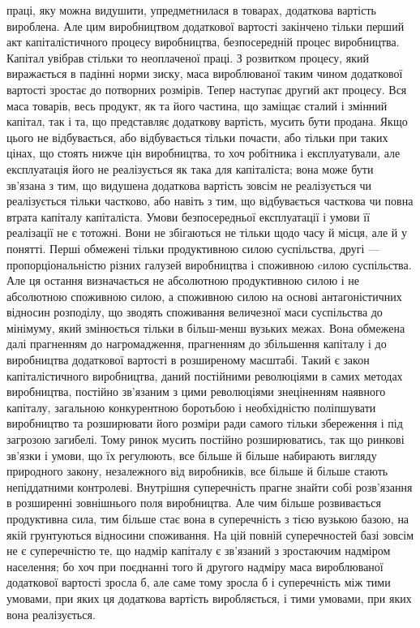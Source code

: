 \parcont{}  %
праці, яку можна видушити, упредметнилася в товарах, додаткова
вартість вироблена. Але цим виробництвом додаткової
вартості закінчено тільки перший акт капіталістичного процесу
виробництва, безпосередній процес виробництва. Капітал увібрав
стільки то неоплаченої праці. З розвитком процесу, який виражається
в падінні норми зиску, маса вироблюваної таким чином
додаткової вартості зростає до потворних розмірів. Тепер
наступає другий акт процесу. Вся маса товарів, весь продукт,
як та його частина, що заміщає сталий і змінний капітал, так
і та, що представляє додаткову вартість, мусить бути продана.
Якщо цього не відбувається, або відбувається тільки почасти,
або тільки при таких цінах, що стоять нижче цін виробництва,
то хоч робітника і експлуатували, але експлуатація його не
реалізується як така для капіталіста; вона може бути зв’язана
з тим, що видушена додаткова вартість зовсім не реалізується чи
реалізується тільки частково, або навіть з тим, що відбувається
часткова чи повна втрата капіталу капіталіста. Умови безпосередньої
експлуатації і умови її реалізації не є тотожні. Вони не
збігаються не тільки щодо часу й місця, але й у понятті. Перші
обмежені тільки продуктивною силою суспільства, другі — пропорціональністю
різних галузей виробництва і споживною cилою
суспільства. Але ця остання визначається не абсолютною продуктивною
силою і не абсолютною споживною силою, а споживною
силою на основі антагоністичних відносин розподілу,
що зводять споживання величезної маси суспільства до мінімуму,
який змінюється тільки в більш-менш вузьких межах.
Вона обмежена далі прагненням до нагромадження, прагненням
до збільшення капіталу і до виробництва додаткової вартості
в розширеному масштабі. Такий є закон капіталістичного виробництва,
даний постійними революціями в самих методах виробництва,
постійно зв’язаним з цими революціями знеціненням
наявного капіталу, загальною конкурентною боротьбою і необхідністю
поліпшувати виробництво та розширювати його розміри
ради самого тільки збереження і під загрозою загибелі. Тому ринок
мусить постійно розширюватись, так що ринкові зв’язки і
умови, що їх регулюють, все більше й більше набирають
вигляду природного закону, незалежного від виробників, все
більше й більше стають непіддатними контролеві. Внутрішня
суперечність прагне знайти собі розв’язання в розширенні зовнішнього
поля виробництва. Але чим більше розвивається продуктивна
сила, тим більше стає вона в суперечність з тією
вузькою базою, на якій грунтуються відносини споживання. На
цій повній суперечностей базі зовсім не є суперечністю те,
що надмір капіталу є зв’язаний з зростаючим надміром населення;
бо хоч при поєднанні того й другого надміру маса вироблюваної
додаткової вартості зросла б, але саме тому зросла б
і суперечність між тими умовами, при яких ця додаткова вартість
виробляється, і тими умовами, при яких вона реалізується.
